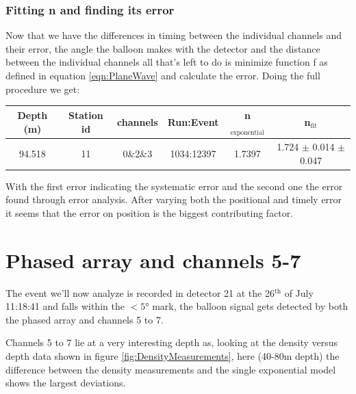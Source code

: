 \subsubsection{Fitting n and finding its error}
Now that we have the differences in timing between the individual channels and their error, the
angle the balloon makes with the detector and the distance between the individual channels
all that's left to do is minimize function f as defined in equation \ref{eqn:PlaneWave} and
calculate the error. Doing the full procedure we get:
\begin{center}
\begin{tabular}{||c c c c c c||}
 \hline
 Depth (m) & Station id & channels & Run:Event & n$_\text{exponential}$ & n$_\text{fit}$\\ [0.5ex]
 \hline\hline
 94.518 & 11 & 0\&2\&3 & 1034:12397 & 1.7397 & 1.724 $\pm$ 0.014 $\pm$ 0.047 \\
 \hline
\end{tabular}
\end{center}
With the first error indicating the systematic error and the second one the error found through
error analysis. After varying both the positional and timely error it seems that the error on position is the biggest
contributing factor.

\section{Phased array and channels 5-7}
The event we'll now analyze is recorded in detector 21 at the 26$^\text{th}$ of July
11:18:41 and falls within the $<5$° mark, the balloon signal gets detected
by both the phased array and channels 5 to 7.

Channels 5 to 7 lie at a very interesting depth as, looking at 
the density versus depth data shown in figure \ref{fig:DensityMeasurements},
here (40-80m depth) the difference between the density measurements and the single
exponential model shows the largest deviations. 

